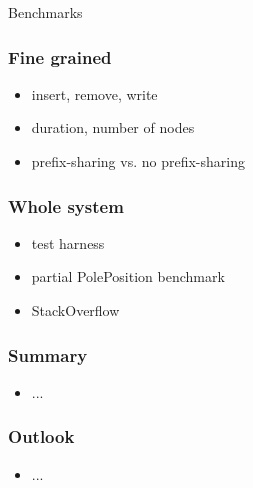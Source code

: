 \documentclass{beamer}
\begin{document}
  \begin{section}{Benchmarks}
    \begin{frame}
      \frametitle{Fine grained}
        \begin{itemize}
          \item insert, remove, write
          \item duration, number of nodes
          \item prefix-sharing vs. no prefix-sharing
        \end{itemize}
    \end{frame}
    \begin{frame}
      \frametitle{Whole system}
        \begin{itemize}
          \item test harness
          \item partial PolePosition benchmark
          \item StackOverflow
        \end{itemize}
    \end{frame}
  \end{section}

  \begin{frame}
    \frametitle{Summary}
      \begin{itemize}
        \item ...
      \end{itemize}
  \end{frame}

  \begin{frame}
    \frametitle{Outlook}
      \begin{itemize}
        \item ...
      \end{itemize}
  \end{frame}
\end{document}
